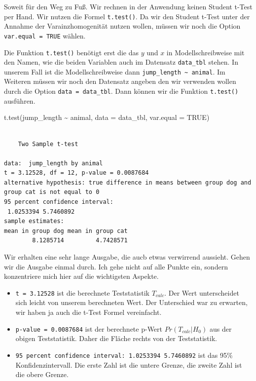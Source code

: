\documentclass[
  letterpaper,
  DIV=11,
  oneside]{scrreport}
\newenvironment{Shaded}{\begin{snugshade}}{\end{snugshade}}
\newcommand{\AttributeTok}[1]{\textcolor[rgb]{0.40,0.45,0.13}{#1}}
\newcommand{\ConstantTok}[1]{\textcolor[rgb]{0.56,0.35,0.01}{#1}}
\newcommand{\FunctionTok}[1]{\textcolor[rgb]{0.28,0.35,0.67}{#1}}
\newcommand{\NormalTok}[1]{\textcolor[rgb]{0.00,0.23,0.31}{#1}}
\newcommand{\SpecialCharTok}[1]{\textcolor[rgb]{0.37,0.37,0.37}{#1}}
\providecommand{\tightlist}{%
  \setlength{\itemsep}{0pt}\setlength{\parskip}{0pt}}\usepackage{longtable,booktabs,array}
\begin{document}
Soweit für den Weg zu Fuß. Wir rechnen in der Anwendung keinen Student
t-Test per Hand. Wir nutzen die Formel \texttt{t.test()}. Da wir den
Student t-Test unter der Annahme der Varainzhomogenität nutzen wollen,
müssen wir noch die Option \texttt{var.equal\ =\ TRUE} wählen.

Die Funktion \texttt{t.test()} benötigt erst die das \(y\) und \(x\) in
Modellschreibweise mit den Namen, wie die beiden Variablen auch im
Datensatz \texttt{data\_tbl} stehen. In unserem Fall ist die
Modellschreibweise dann
\texttt{jump\_length\ \textasciitilde{}\ animal}. Im Weiteren müssen wir
noch den Datensatz angeben den wir verwenden wollen durch die Option
\texttt{data\ =\ data\_tbl}. Dann können wir die Funktion
\texttt{t.test()} ausführen.

\begin{Shaded}
\begin{Highlighting}[]
\FunctionTok{t.test}\NormalTok{(jump\_length }\SpecialCharTok{\textasciitilde{}}\NormalTok{ animal, }
       \AttributeTok{data =}\NormalTok{ data\_tbl, }\AttributeTok{var.equal =} \ConstantTok{TRUE}\NormalTok{)}
\end{Highlighting}
\end{Shaded}

\begin{verbatim}

    Two Sample t-test

data:  jump_length by animal
t = 3.12528, df = 12, p-value = 0.0087684
alternative hypothesis: true difference in means between group dog and group cat is not equal to 0
95 percent confidence interval:
 1.0253394 5.7460892
sample estimates:
mean in group dog mean in group cat 
        8.1285714         4.7428571 
\end{verbatim}

Wir erhalten eine sehr lange Ausgabe, die aucb etwas verwirrend
aussieht. Gehen wir die Ausgabe einmal durch. Ich gehe nicht auf alle
Punkte ein, sondern konzentriere mich hier auf die wichtigsten Aspekte.

\begin{itemize}
\tightlist
\item
  \texttt{t\ =\ 3.12528} ist die berechnete Teststatistik \(T_{calc}\).
  Der Wert unterscheidet sich leicht von unserem berechneten Wert. Der
  Unterschied war zu erwarten, wir haben ja auch die t-Test Formel
  vereinfacht.
\item
  \texttt{p-value\ =\ 0.0087684} ist der berechnete p-Wert
  \(Pr(T_{calc}|H_0)\) aus der obigen Teststatistik. Daher die Fläche
  rechts von der Teststatistik.
\item
  \texttt{95\ percent\ confidence\ interval:\ 1.0253394\ 5.7460892} ist
  das 95\% Konfidenzintervall. Die erste Zahl ist die untere Grenze, die
  zweite Zahl ist die obere Grenze.
\end{itemize}
\end{document}
